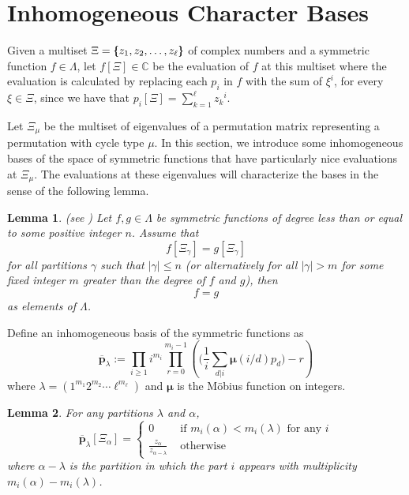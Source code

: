 \documentclass{amsart}
\newtheorem{lemma}{Lemma}[section]
\theoremstyle{definition}
\newcommand{\multi}[1]{\left\{\mskip-9mu\left\{#1\right\}\mskip-9mu\right\}}
\newcommand{\C}{\mathbb{C}}
\begin{document}
\section{Inhomogeneous Character Bases}
\label{sec:character bases}

Given a multiset $\Xi=\multi{z_1,z_2,\ldots,z_\ell}$ of complex numbers and a
symmetric function $f\in\Lambda$, let $f[\Xi]\in\C$ be the evaluation of
$f$ at this multiset where the evaluation is calculated by
replacing each $p_i$ in $f$ with the sum of $\xi^i$, for every $\xi\in \Xi$, since we have that $p_i[\Xi] = \sum_{k=1}^\ell {z_k}^i$.

Let $\Xi_\mu$ be the multiset of eigenvalues of a permutation matrix representing a
permutation with cycle type $\mu$.
In this section, we introduce some inhomogeneous bases of the space of symmetric
functions that have particularly nice evaluations at $\Xi_\mu$.
The evaluations at these eigenvalues will characterize the bases in the
sense of the following lemma.

\begin{lemma}\label{lemma:evaluation}
(see \cite[Proposition 39, Corollary 41]{OZ_character})
Let $f,g \in \Lambda$ be symmetric functions
of degree less than or equal to some positive integer $n$.
Assume that $$f[\Xi_\gamma] = g[\Xi_\gamma]$$ for all partitions
$\gamma$ such that $|\gamma| \leq n$ (or alternatively for all $|\gamma| > m$ for some fixed
integer $m$ greater than the degree of $f$ and $g$), then
$$f=g$$
as elements of $\Lambda$.
\end{lemma}

Define an inhomogeneous basis of the symmetric functions as
\begin{equation}\label{eq:def_power}
{\overline{\mathbf p}}_{\lambda} := \prod_{i\ge 1} i^{m_i} \prod_{r = 0}^{m_i-1} \left( \Big( \frac{1}{i} \sum_{d|i} {\boldsymbol \mu}(i/d) p_d \Big) - r \right)
\end{equation}
where $\lambda=(1^{m_1}2^{m_2}\cdots \ell^{m_\ell})$ and ${\boldsymbol \mu}$ is the M\"obius function on integers.

\begin{lemma}\label{lem:evaluation_of_pbar}
	For any partitions $\lambda$ and $\alpha$,
	\[\overline{\mathbf p}_\lambda[\Xi_\alpha]=\begin{cases}
		0 & \text{ if $m_i(\alpha)<m_i(\lambda)$ for any $i$}\\
		\frac{z_\alpha}{z_{\alpha-\lambda}} & \text{ otherwise}
	\end{cases}\]
	where $\alpha-\lambda$ is the partition in which the part $i$ appears
	with multiplicity $m_i(\alpha)-m_i(\lambda)$.
\end{lemma}
\end{document}
